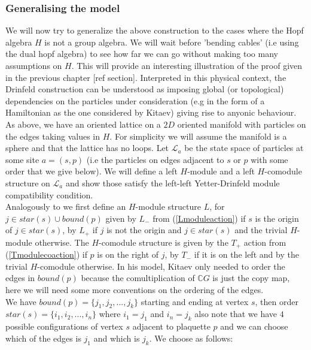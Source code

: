 \documentclass{article}
\begin{document}
\subsubsection{Generalising the model}
We will now try to generalize the above construction to the cases where the Hopf algebra $H$ is not a group algebra. We will wait before 'bending cables' (i.e using the dual hopf algebra) to see how far we can go without making too many assumptions on $H$. This will provide an interesting illustration of the proof given in the previous chapter [ref section]. Interpreted in this physical context, the Drinfeld construction can be understood as imposing global (or topological) dependencies on the particles under consideration (e.g in  the form of a Hamiltonian as the one considered by Kitaev) giving rise to anyonic behaviour.\\
As above, we have an oriented lattice on a $2D$ oriented manifold with particles on the edges taking values in $H$. For simplicity we will assume the manifold is a sphere and that the lattice has no loops. 
Let $\mathcal{L}_a$ be the state space of particles at some site $a=(s,p)$ (i.e the particles on edges adjacent to $s$ or $p$ with some order that we give below). We will define a left $H$-module and a left $H$-comodule structure on $\mathcal{L}_a$ and show those satisfy the left-left Yetter-Drinfeld module compatibility condition.\\
Analogously to \cite{Kitaev03} we first define an $H$-module structure $L$, for $j \in star(s) \cup bound(p)$ given by $L_-$ from (\ref{Lmoduleaction}) if $s$ is the origin of $j \in star(s)$, by $L_+$ if $j$ is not the origin and $j \in star(s)$ and the trivial $H$-module otherwise. The $H$-comodule structure is given by the $T_+$ action from (\ref{Tmodulecoaction}) if $p$ is on the right of $j$, by $T_-$ if it is on the left and by the trivial $H$-comodule otherwise. In his model, Kitaev only needed to order the edges in $bound(p)$ because the comultiplication of $\mathbb{C}G$ is just the copy map, here we will need some more conventions on the ordering of the edges.\\
We have $bound(p)= \{j_1, j_2,..., j_k\}$ starting and ending at vertex $s$, then order $star(s)=\{i_1, i_2, ..., i_n\}$ where $i_1=j_1$ and $i_n=j_k$ also note that we have $4$ possible configurations of vertex $s$ adjacent to plaquette $p$ and we can choose which of the edges is $j_1$ and which is $j_k$. We choose as follows:
\end{document}
